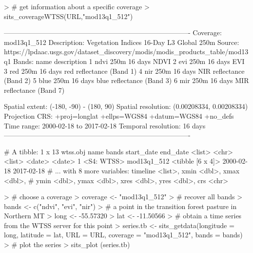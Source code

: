 \documentclass[article]{jss}
\begin{document}
\begin{CodeChunk}

\begin{CodeInput}
> # get information about a specific coverage
> sits_coverageWTSS(URL,"mod13q1_512")
\end{CodeInput}

\begin{CodeOutput}
----------------------------------------------------------------------------------
Coverage: mod13q1_512
Description: Vegetation Indices 16-Day L3 Global 250m
Source: https://lpdaac.usgs.gov/dataset_discovery/modis/modis_products_table/mod13q1
Bands: 
  name                            description
1 ndvi                      250m 16 days NDVI
2  evi                       250m 16 days EVI
3  red  250m 16 days red reflectance (Band 1)
4  nir  250m 16 days NIR reflectance (Band 2)
5 blue 250m 16 days blue reflectance (Band 3)
6  mir  250m 16 days MIR reflectance (Band 7)

Spatial extent: (-180, -90) - (180, 90)
Spatial resolution: (0.00208334, 0.00208334)
Projection CRS: +proj=longlat +ellps=WGS84 +datum=WGS84 +no_defs
Time range: 2000-02-18 to 2017-02-18
Temporal resolution: 16 days 
----------------------------------------------------------------------------------
\end{CodeOutput}

\begin{CodeOutput}
# A tibble: 1 x 13
    wtss.obj        name            bands start_date   end_date
      <list>       <chr>           <list>     <date>     <date>
1 <S4: WTSS> mod13q1_512 <tibble [6 x 4]> 2000-02-18 2017-02-18
# ... with 8 more variables: timeline <list>, xmin <dbl>, xmax <dbl>,
#   ymin <dbl>, ymax <dbl>, xres <dbl>, yres <dbl>, crs <chr>
\end{CodeOutput}

\begin{CodeInput}
> # choose a coverage
> coverage <- "mod13q1_512"
> # recover all bands
> bands <- c("ndvi", "evi", "nir")
> # a point in the transition forest pasture in Northern MT
> long <- -55.57320
> lat <- -11.50566
> # obtain a time series from the WTSS server for this point
> series.tb <- sits_getdata(longitude = long, latitude = lat, URL = URL, coverage = "mod13q1_512", bands = bands)
> # plot the series
> sits_plot (series.tb)
\end{CodeInput}



\end{CodeChunk}
\end{document}
